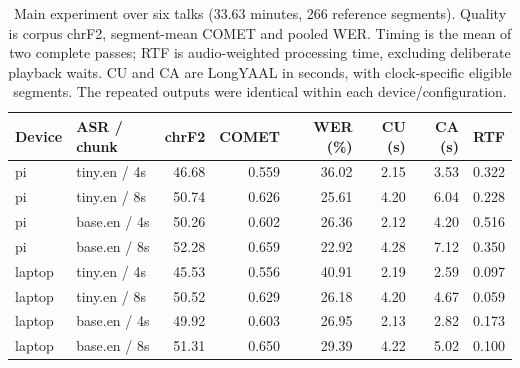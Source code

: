 \begin{table}[htbp]
\centering
\small
\begin{tabular}{llrrrrrr}
\toprule
Device & ASR / chunk & chrF2 & COMET & WER (\%) & CU (s) & CA (s) & RTF \\
\midrule
pi & tiny.en / 4s & 46.68 & 0.559 & 36.02 & 2.15 & 3.53 & 0.322 \\
pi & tiny.en / 8s & 50.74 & 0.626 & 25.61 & 4.20 & 6.04 & 0.228 \\
pi & base.en / 4s & 50.26 & 0.602 & 26.36 & 2.12 & 4.20 & 0.516 \\
pi & base.en / 8s & 52.28 & 0.659 & 22.92 & 4.28 & 7.12 & 0.350 \\
laptop & tiny.en / 4s & 45.53 & 0.556 & 40.91 & 2.19 & 2.59 & 0.097 \\
laptop & tiny.en / 8s & 50.52 & 0.629 & 26.18 & 4.20 & 4.67 & 0.059 \\
laptop & base.en / 4s & 49.92 & 0.603 & 26.95 & 2.13 & 2.82 & 0.173 \\
laptop & base.en / 8s & 51.31 & 0.650 & 29.39 & 4.22 & 5.02 & 0.100 \\
\bottomrule
\end{tabular}
\caption{Main experiment over six talks (33.63 minutes, 266 reference segments). Quality is corpus chrF2, segment-mean COMET and pooled WER. Timing is the mean of two complete passes; RTF is audio-weighted processing time, excluding deliberate playback waits. CU and CA are LongYAAL in seconds, with clock-specific eligible segments. The repeated outputs were identical within each device/configuration.}
\label{tab:main-results}
\end{table}
